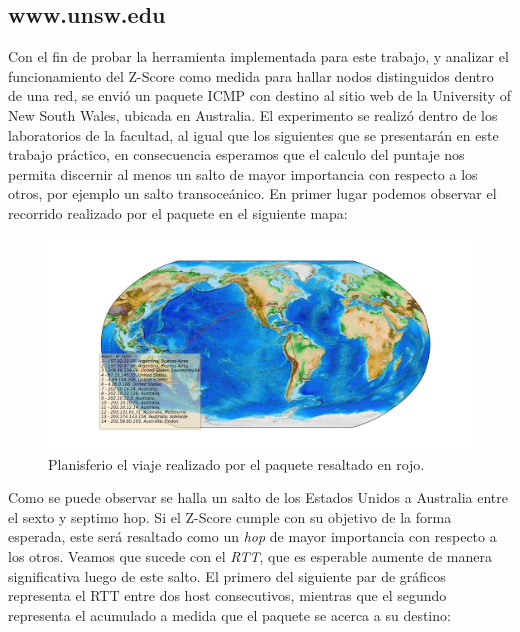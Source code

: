 \subsection{www.unsw.edu}

Con el fin de probar la herramienta implementada para este trabajo, y analizar el funcionamiento del Z-Score como medida para hallar nodos distinguidos dentro de una red, se envió un paquete ICMP con destino al sitio web de la University of New South Wales, ubicada en Australia. El experimento se realizó dentro de los laboratorios de la facultad, al igual que los siguientes que se presentarán en este trabajo práctico, en consecuencia esperamos que el calculo del puntaje nos permita discernir al menos un salto de mayor importancia con respecto a los otros, por ejemplo un salto transoceánico. En primer lugar podemos observar el recorrido realizado por el paquete en el siguiente mapa:

\begin{landscape}
\begin{figure}[H]
  \centering	
	\includegraphics[scale=0.5]{../australia-experiment/figure_1.jpeg}
  \caption{Planisferio el viaje realizado por el paquete resaltado en rojo.}
	\label{fig:histo-src-sitiotrabajo}
\end{figure}
\end{landscape}

Como se puede observar se halla un salto de los Estados Unidos a Australia entre el sexto y septimo hop. Si el Z-Score cumple con su objetivo de la forma esperada, este será resaltado como un \textit{hop} de mayor importancia con respecto a los otros. Veamos que sucede con el \textit{RTT}, que es esperable aumente de manera significativa luego de este salto. El primero del siguiente par de gráficos representa el RTT entre dos host consecutivos, mientras que el segundo representa el acumulado a medida que el paquete se acerca a su destino: 

